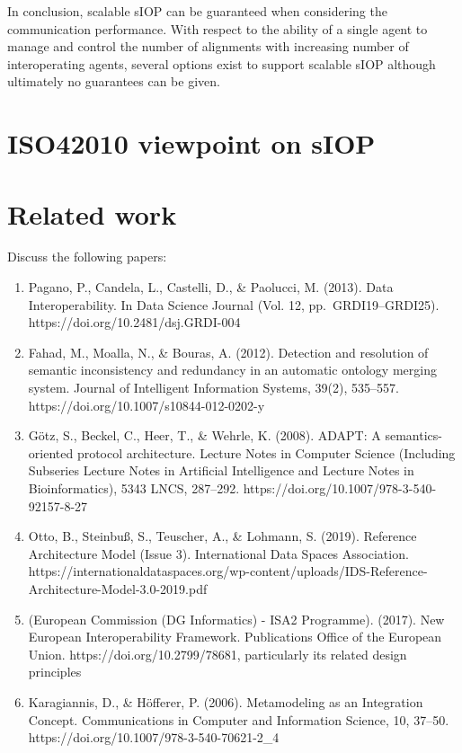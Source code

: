 \documentclass[sort&compress,preprint,authoryear,3p,twocolumn]{elsarticle}
\providecommand{\tightlist}{%
  \setlength{\itemsep}{0pt}\setlength{\parskip}{0pt}}
\begin{document}
In conclusion, scalable sIOP can be guaranteed when considering the
communication performance. With respect to the ability of a single agent
to manage and control the number of alignments with increasing number of
interoperating agents, several options exist to support scalable sIOP
although ultimately no guarantees can be given.

\hypertarget{iso42010-viewpoint-on-siop}{%
\section{ISO42010 viewpoint on sIOP}\label{iso42010-viewpoint-on-siop}}

\hypertarget{related-work}{%
\section{Related work}\label{related-work}}

Discuss the following papers:

\begin{enumerate}
\def\labelenumi{\arabic{enumi}.}
\tightlist
\item
  Pagano, P., Candela, L., Castelli, D., \& Paolucci, M. (2013). Data
  Interoperability. In Data Science Journal (Vol. 12,
  pp.~GRDI19--GRDI25). https://doi.org/10.2481/dsj.GRDI-004
\item
  Fahad, M., Moalla, N., \& Bouras, A. (2012). Detection and resolution
  of semantic inconsistency and redundancy in an automatic ontology
  merging system. Journal of Intelligent Information Systems, 39(2),
  535--557. https://doi.org/10.1007/s10844-012-0202-y
\item
  Götz, S., Beckel, C., Heer, T., \& Wehrle, K. (2008). ADAPT: A
  semantics-oriented protocol architecture. Lecture Notes in Computer
  Science (Including Subseries Lecture Notes in Artificial Intelligence
  and Lecture Notes in Bioinformatics), 5343 LNCS, 287--292.
  https://doi.org/10.1007/978-3-540-92157-8-27
\item
  Otto, B., Steinbuß, S., Teuscher, A., \& Lohmann, S. (2019). Reference
  Architecture Model (Issue 3). International Data Spaces Association.
  https://internationaldataspaces.org/wp-content/uploads/IDS-Reference-Architecture-Model-3.0-2019.pdf
\item
  (European Commission (DG Informatics) - ISA2 Programme). (2017). New
  European Interoperability Framework. Publications Office of the
  European Union. https://doi.org/10.2799/78681, particularly its
  related design principles
\item
  \cite{Karagiannis2006} Karagiannis, D., \& Höfferer, P. (2006).
  Metamodeling as an Integration Concept. Communications in Computer and
  Information Science, 10, 37--50.
  https://doi.org/10.1007/978-3-540-70621-2\_4
\end{enumerate}
\end{document}

